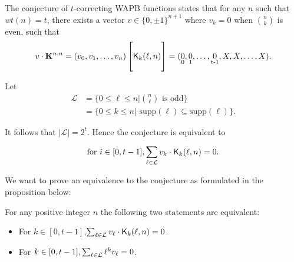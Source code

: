 The conjecture of $t$-correcting WAPB functions states that for any $n$ such that $wt(n) = t$, there exists a vector $v \in \{0, \pm 1\}^{n+1}$ where $v_k = 0$ when $\binom{n}{k}$ is even, such that
$$
v \cdot \mathbf{K}^{n,n} = (v_0, v_1, \ldots, v_n)
\begin{bmatrix}
    \\
    \mathsf{K}_{k}(\ell,n)\\
    \\
\end{bmatrix} = (\underset{\operatorname{0}}{0}, \underset{\operatorname{1}}{0}, \ldots, \underset{\operatorname{t - 1}}{0}, X, X, \ldots, X).
$$

Let
\begin{equation*}
\begin{split}
    \mathcal{L} &= \{0 \leq \ell \leq n | \binom{n}{\ell} \text{ is odd}\}\\
    &=\{0 \leq k \leq n | \text{ supp}(\ell) \subseteq \text{supp}(\ell)\}.
\end{split}
\end{equation*}

It follows that $|\mathcal{L}| = 2^t$. Hence the conjecture is equivalent to

\begin{equation}\label{eq:statement}
    \text{for } i \in [0, t-1], \sum_{\ell \in \mathcal{L}} v_k \cdot \mathsf{K}_{k}(\ell,n) = 0.
\end{equation}


We want to prove an equivalence to the conjecture as formulated in the proposition below:
\begin{proposition}\label{prop:equivalence}
	For any positive integer $n$    the following two statements are equivalent:
    \begin{itemize}
        \item For $k \in [0, t-1]$,$ \sum_{\ell \in \mathcal{L}} v_\ell \cdot \mathsf{K}_{k}(\ell,n) = 0$.
        \item For $k \in [0,t-1], \sum_{\ell \in \mathcal{L}} \ell^kv_\ell= 0$.
    \end{itemize}
\end{proposition}

